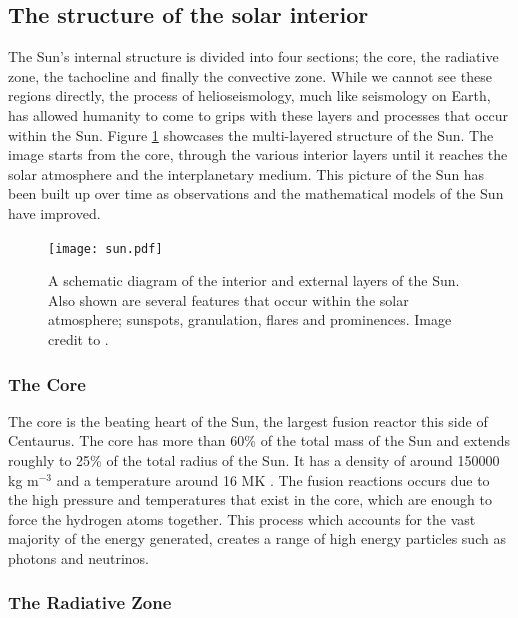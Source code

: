 \subsection{The structure of the solar interior}

    The Sun's internal structure is divided into four sections; the core, the radiative zone, the tachocline and finally the convective zone.
    While we cannot see these regions directly, the process of helioseismology, much like seismology on Earth, has allowed humanity to come to grips with these layers and processes that occur within the Sun.
    Figure \ref{fig:Sun} showcases the multi-layered structure of the Sun.
    The image starts from the core, through the various interior layers until it reaches the solar atmosphere and the interplanetary medium.
    This picture of the Sun has been built up over time as observations and the mathematical models of the Sun have improved. 
    
    \begin{figure}
        \centering
        \texttt{[image: sun.pdf]}
        \caption{
                A schematic diagram of the interior and external layers of the Sun.
                Also shown are several features that occur within the solar atmosphere; sunspots, granulation, flares and prominences.
                Image credit to \cite{sun_image}.
               }
        \label{fig:Sun}
    \end{figure}

\subsubsection{The Core}

    The core is the beating heart of the Sun, the largest fusion reactor this side of Centaurus.
    The core has more than 60\% of the total mass of the Sun and extends roughly to 25\% of the total radius of the Sun.
    It has a density of around 150000 kg m$^{-3}$ and a temperature around 16 MK \citep{0004-637X-699-2-1403}.
    The fusion reactions occurs due to the high pressure and temperatures that exist in the core, which are enough to force the hydrogen atoms together. 
    This process which accounts for the vast majority of the energy generated, creates a range of high energy particles such as photons and neutrinos.
    
\subsubsection{The Radiative Zone}

